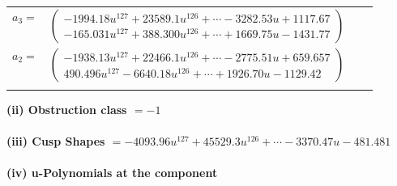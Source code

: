 \documentclass[1p]{elsarticle_modified}
\theoremstyle{definition}
\begin{document}
\begin{tabular}{m{7pt} m{180pt} m{7pt} m{180pt} }
\flushright $a_{3}=$&$\begin{pmatrix}-1994.18 u^{127}+23589.1 u^{126}+\cdots-3282.53 u+1117.67\\-165.031 u^{127}+388.300 u^{126}+\cdots+1669.75 u-1431.77\end{pmatrix}$ \\
\flushright $a_{2}=$&$\begin{pmatrix}-1938.13 u^{127}+22466.1 u^{126}+\cdots-2775.51 u+659.657\\490.496 u^{127}-6640.18 u^{126}+\cdots+1926.70 u-1129.42\end{pmatrix}$\\&\end{tabular}
\flushleft \textbf{(ii) Obstruction class $= -1$}\\~\\
\flushleft \textbf{(iii) Cusp Shapes $= -4093.96 u^{127}+45529.3 u^{126}+\cdots-3370.47 u-481.481$}\\~\\
\newpage\renewcommand{\arraystretch}{1}
\flushleft \textbf{(iv) u-Polynomials at the component}\newline \\
\end{document}
